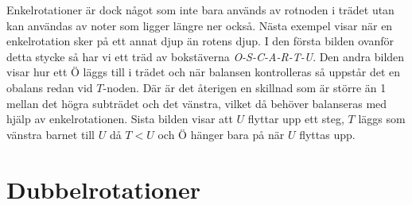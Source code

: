 \documentclass[a5paper,10pt,oneside]{article}
\begin{document}
Enkelrotationer är dock något som inte bara används av rotnoden i trädet utan kan användas av noter som ligger längre ner också. Nästa exempel visar när en enkelrotation sker på ett annat djup än rotens djup. I den första bilden ovanför detta stycke så har vi ett träd av bokstäverna \textit{O-S-C-A-R-T-U}. Den andra bilden visar hur ett $Ö$ läggs till i trädet och när balansen kontrolleras så uppstår det en obalans redan vid $T$-noden. Där är det återigen en skillnad som är större än 1 mellan det högra subträdet och det vänstra, vilket då behöver balanseras med hjälp av enkelrotationen. Sista bilden visar att $U$ flyttar upp ett steg, $T$ läggs som vänstra barnet till $U$ då $T < U$ och $Ö$ hänger bara på när $U$ flyttas upp. 

\section*{Dubbelrotationer}
\end{document}
